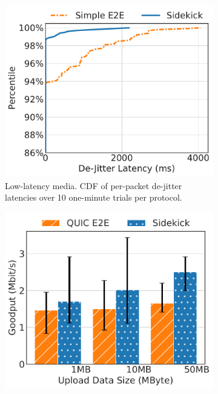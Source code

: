 \begin{figure}[t]
\centering
\begin{subfigure}{0.48\linewidth}
	\includegraphics[width=\linewidth]{figures/fig8_real_world_webrtc.pdf}
	\vspace{-0.5cm}
	\caption{\footnotesize Low-latency media. CDF of per-packet de-jitter
	latencies over 10 one-minute trials per protocol.}
	\label{fig:real-world:scenario1}
\end{subfigure}
\begin{subfigure}{0.48\linewidth}
	\includegraphics[width=\linewidth]{figures/fig8_real_world_retx.pdf}

\end{subfigure}
\end{figure}
